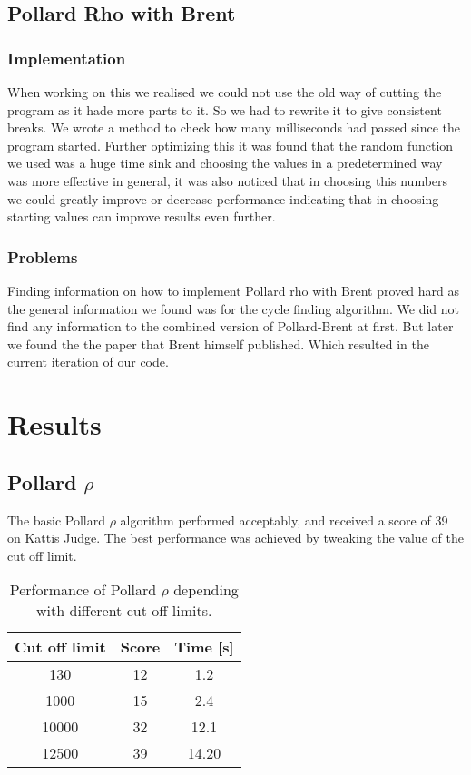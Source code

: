\documentclass[a4paper, 12pt]{report}
\begin{document}
\section{Pollard Rho with Brent}
\subsection{Implementation}
When working on this we realised we could not use the old way of cutting the program as it hade more parts to it. So we had to rewrite it to give consistent breaks. We wrote a method to check how many milliseconds had passed since the program started. Further optimizing this it was found that the random function we used was a huge time sink and choosing the values in a predetermined way was more effective in general, it was also noticed that in choosing this numbers we could greatly improve or decrease performance indicating that in choosing starting values can improve results even further.

\subsection{Problems}
Finding information on how to implement Pollard rho with Brent proved hard as the general information we found was for the cycle finding algorithm. We did not find any information to the combined version of Pollard-Brent at first. But later we found the the paper that Brent himself published. Which resulted in the current iteration of our code\cite{brentpdf}.
\chapter{Results}

\section{Pollard $\rho$}
The basic Pollard $\rho$ algorithm performed acceptably, and received a score of 39 on Kattis Judge. The best performance was achieved by tweaking the value of the cut off limit.
\begin{table}[ht]
\caption{Performance of Pollard $\rho$ depending with different cut off limits.}
\begin{tabular} {c c c}
Cut off limit 	&	 Score 	& Time [s] \\ \hline
130		&	12		& 1.2 \\
1000	&	15		& 2.4 \\
10000 	& 	32		& 12.1 \\
12500	&	39		&14.20 \\

\end{tabular}
\end{table}
\end{document}
